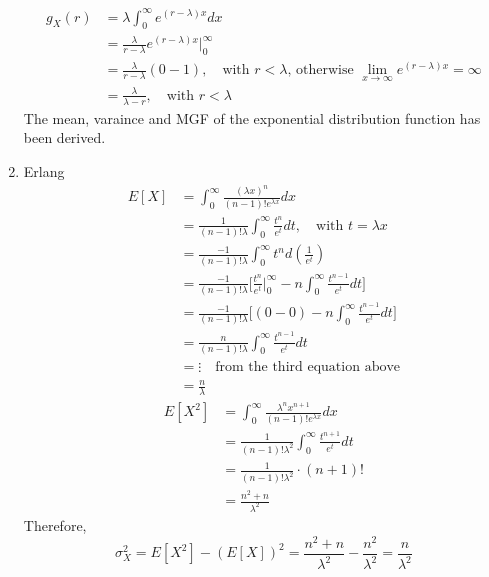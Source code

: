 \documentclass[UTF8]{article}
\begin{document}
\begin{enumerate}
        \begin{equation*}
          \begin{split}
             g_X(r)
               & =\lambda\int_{0}^{\infty}e^{(r-\lambda)x}dx\\
               & =\frac{\lambda}{r-\lambda}e^{(r-\lambda)x}\big|^\infty_0\\
               &=\frac{\lambda}{r-\lambda}(0-1),\quad\text{with $r<\lambda$, otherwise $\lim_{x\rightarrow\infty}e^{(r-\lambda)x}=\infty$}\\
               &=\frac{\lambda}{\lambda-r},\quad\text{with $r<\lambda$}
          \end{split}
        \end{equation*}
        The mean, varaince and MGF of the exponential distribution function has been derived.
        \item Erlang
            \begin{equation*}
                \begin{split}
                    E[X] &=\int_{0}^\infty\frac{(\lambda x)^{n}}{(n-1)!e^{\lambda x}}dx\\
                    &=\frac{1}{(n-1)!\lambda}\int_0^\infty\frac{t^n}{e^t}dt,\quad\text{with $t=\lambda x$}\\
                    &=\frac{-1}{(n-1)!\lambda}\int_0^\infty t^nd(\frac{1}{e^t})\\
                    &=\frac{-1}{(n-1)!\lambda}\bigg[\frac{t^n}{e^t}\bigg|^\infty_0-n\int^\infty_0\frac{t^{n-1}}{e^t}dt\bigg]\\
                    &=\frac{-1}{(n-1)!\lambda}\bigg[(0-0)-n\int^\infty_0\frac{t^{n-1}}{e^t}dt\bigg]\\
                    &=\frac{n}{(n-1)!\lambda}\int^\infty_0\frac{t^{n-1}}{e^t}dt\\
                    &=\vdots\quad\text{from the third equation above}\\
                    &=\frac{n}{\lambda}
                \end{split}
            \end{equation*}
            \begin{equation*}
                \begin{split}
                    E[X^2] &= \int^\infty_{0}\frac{\lambda^nx^{n+1}}{(n-1)!e^{\lambda x}}dx\\
                    &= \frac{1}{(n-1)!\lambda^2}\int_0^\infty\frac{t^{n+1}}{e^t}dt\\
                    &= \frac{1}{(n-1)!\lambda^2}\cdot(n+1)!\\
                    &= \frac{n^2+n}{\lambda^2}
                \end{split}
            \end{equation*}
            Therefore, 
            \begin{equation*}
                \sigma^2_X=E[X^2]-(E[X])^2=\frac{n^2+n}{\lambda^2}-\frac{n^2}{\lambda^2}=\frac{n}{\lambda^2}
            \end{equation*}


\end{enumerate}
\end{document}
